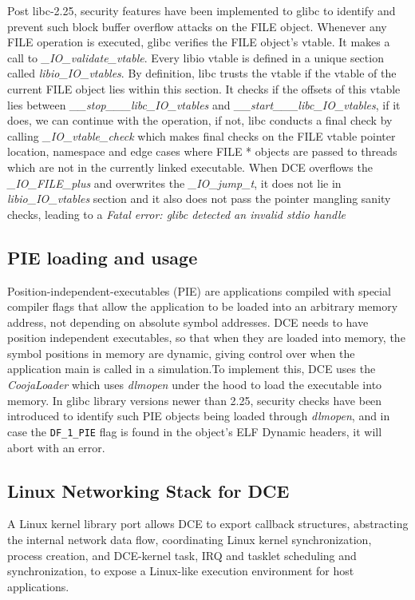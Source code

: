 \documentclass{sig-alternate}
\begin{document}
\sloppy Post libc-2.25, security features have been implemented to glibc to identify 
and prevent such block buffer overflow attacks on the FILE object. Whenever any FILE
operation is executed, glibc 
verifies the FILE object's vtable. It makes a call to 
\textit{\_IO\_validate\_vtable}. Every libio vtable is defined in a unique section called \textit{libio\_IO\_vtables}. By definition, libc trusts
the vtable if the vtable of the current FILE object lies within this section. It checks if the offsets of this vtable lies between 
\textit{\_\_stop\_\_\_libc\_IO\_vtables} and \textit{\_\_start\_\_\_libc\_IO\_vtables}, if it does, we can continue with the operation, if not, libc 
conducts a final check by calling \textit{\_IO\_vtable\_check} which makes final checks on the FILE vtable pointer location, namespace and edge cases
where FILE * objects are passed to threads which are not in the currently linked executable.  When DCE overflows the \textit{\_IO\_FILE\_plus} and 
overwrites the \textit{\_IO\_jump\_t}, it does not lie in \textit{libio\_IO\_vtables} section and it also does not pass the pointer mangling sanity checks, leading to 
a \textit{Fatal error: glibc detected an invalid stdio handle}

\subsection{PIE loading and usage}
Position-independent-executables (PIE) are applications compiled with special compiler flags that allow the application to be loaded into an arbitrary
memory address, not depending on absolute symbol addresses. DCE needs to have position independent executables, so that when they are loaded into memory,
the symbol positions in memory are dynamic, giving control over when the application main is called in a simulation.To implement this, DCE uses the \textit{CoojaLoader}
which uses \textit{dlmopen} under the hood to load the executable into memory. In glibc library versions newer than 2.25, security checks have been introduced to 
identify such PIE objects being loaded through \textit{dlmopen}, and in case the \texttt{DF\_1\_PIE} flag is found in the object's ELF Dynamic headers, it will abort 
with an error.
 

\subsection{Linux Networking Stack for DCE}
A Linux kernel library port allows DCE to export callback structures, abstracting the internal network data flow, coordinating Linux kernel synchronization, 
process creation, and DCE-kernel task, IRQ and tasklet scheduling and synchronization, to expose a Linux-like execution environment for host applications. 
\end{document}
